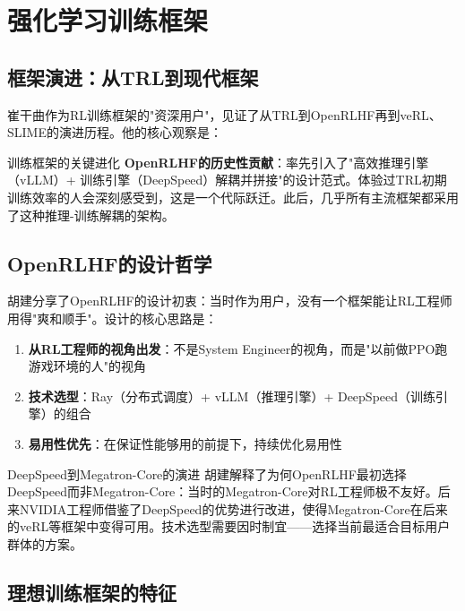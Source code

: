 \section{强化学习训练框架}

\subsection{框架演进：从TRL到现代框架}

崔干曲作为RL训练框架的"资深用户"，见证了从TRL到OpenRLHF再到veRL、SLIME的演进历程。他的核心观察是：

\begin{importantbox}{训练框架的关键进化}
\textbf{OpenRLHF的历史性贡献}：率先引入了"高效推理引擎（vLLM）+ 训练引擎（DeepSpeed）解耦并拼接"的设计范式。体验过TRL初期训练效率的人会深刻感受到，这是一个代际跃迁。此后，几乎所有主流框架都采用了这种推理-训练解耦的架构。
\end{importantbox}

\subsection{OpenRLHF的设计哲学}

胡建分享了OpenRLHF的设计初衷：当时作为用户，没有一个框架能让RL工程师用得"爽和顺手"。设计的核心思路是：

\begin{enumerate}
    \item \textbf{从RL工程师的视角出发}：不是System Engineer的视角，而是"以前做PPO跑游戏环境的人"的视角
    \item \textbf{技术选型}：Ray（分布式调度）+ vLLM（推理引擎）+ DeepSpeed（训练引擎）的组合
    \item \textbf{易用性优先}：在保证性能够用的前提下，持续优化易用性
\end{enumerate}

\begin{knowledgebox}{DeepSpeed到Megatron-Core的演进}
胡建解释了为何OpenRLHF最初选择DeepSpeed而非Megatron-Core：当时的Megatron-Core对RL工程师极不友好。后来NVIDIA工程师借鉴了DeepSpeed的优势进行改进，使得Megatron-Core在后来的veRL等框架中变得可用。技术选型需要因时制宜——选择当前最适合目标用户群体的方案。
\end{knowledgebox}

\subsection{理想训练框架的特征}

